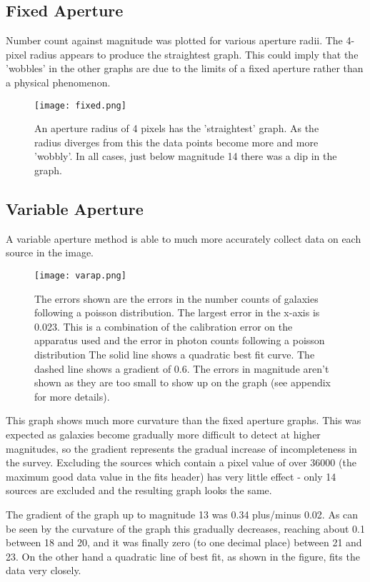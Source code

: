 \documentclass[a4paper,11pt,twoside]{article}
\begin{document}
\subsection{Fixed Aperture}

Number count against magnitude was plotted for various aperture radii. The 4-pixel radius appears to produce the straightest graph. This could imply that the 'wobbles' in the other graphs are due to the limits of a fixed aperture rather than a physical phenomenon. 

\begin{figure}[htb]
  \centering
  \texttt{[image: fixed.png]}
  \caption{An aperture radius of 4 pixels has the 'straightest' graph. As the radius diverges from this the data points become more and more 'wobbly'. In all cases, just below magnitude 14 there was a dip in the graph.} 
  \label{fig:fixed}
\end{figure}

\subsection{Variable Aperture}

A variable aperture method is able to much more accurately collect data on each source in the image.

\begin{figure}[htb]
  \centering
  \texttt{[image: varap.png]}
  \caption{The errors shown are the errors in the number counts of galaxies following a poisson distribution. The largest error in the x-axis is 0.023. This is a combination of the calibration error on the apparatus used and the error in photon counts following a poisson distribution The solid line shows a quadratic best fit curve. The dashed line shows a gradient of 0.6. The errors in magnitude aren't shown as they are too small to show up on the graph (see appendix for more details).}
  \label{fig:varap}
\end{figure}


This graph shows much more curvature than the fixed aperture graphs. This was expected as galaxies become gradually more difficult to detect at higher magnitudes, so the gradient represents the gradual increase of incompleteness in the survey.
Excluding the sources which contain a pixel value of over 36000 (the maximum good data value in the fits header) has very little effect - only 14 sources are excluded and the resulting graph looks the same.

The gradient of the graph up to magnitude 13 was 0.34 plus/minus 0.02. As can be seen by the curvature of the graph this gradually decreases, reaching about 0.1 between 18 and 20, and it was finally zero (to one decimal place) between 21 and 23. 
On the other hand a quadratic line of best fit, as shown in the figure, fits the data very closely. 
\end{document}

